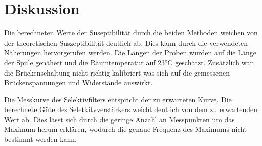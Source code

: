 \section{Diskussion}
\label{sec:Diskussion}
Die berechneten Werte der Suseptibilität durch die beiden Methoden weichen von der
theoretischen Suszeptibilität deutlich ab. Dies kann durch die verwendeten Näherungen hervorgerufen werden.
Die Längen der Proben wurden auf die Länge der Spule genähert und die Raumtemperatur auf $23$°C geschätzt.
Zusätzlich war die Brückenschaltung nicht richtig kalibriert was sich auf die gemessenen Brückenspannungen
und Widerstände auswirkt.

Die Messkurve des Selektivfilters entspricht der zu erwarteten Kurve. Die berechnete Güte des Seletkitvverstärkers weicht deutlich von dem
zu erwartenden Wert ab. Dies lässt sich durch die geringe Anzahl an Messpunkten um das Maximum herum erklären, wodurch die genaue Frequenz des
Maximums nicht bestimmt werden kann.
